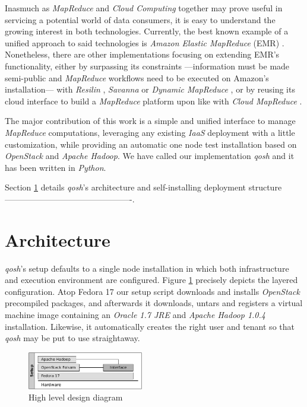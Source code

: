 \documentclass{sig-alternate}
\begin{document}
Inasmuch as \emph{MapReduce} and \emph{Cloud Computing} together may prove useful in servicing a potential world of data consumers, it is easy to understand the growing interest in both technologies. Currently, the best known example of a unified approach to said technologies is \emph{Amazon Elastic MapReduce} (EMR) \cite{emr:2013:online}. Nonetheless, there are other implementations focusing on extending EMR's functionality, either by surpassing its constraints ---information must be made semi-public and \emph{MapReduce} workflows need to be executed on Amazon's installation--- with \emph{Resilin} \cite{resilin}, \emph{Savanna} \cite{savanna:2013:online} or \emph{Dynamic MapReduce} \cite{dynamicmapreduce}, or by reusing its cloud interface to build a \emph{MapReduce} platform upon like with \emph{Cloud MapReduce} \cite{cloudmapreduce}.

The major contribution of this work is a simple and unified interface to manage \emph{MapReduce} computations, leveraging any existing \emph{IaaS} deployment with a little customization, while providing an automatic one node test installation based on \emph{OpenStack} and \emph{Apache Hadoop}. We have called our implementation \emph{qosh} and it has been written in \emph{Python}.

Section \ref{sec:arch} details \emph{qosh}'s architecture and self-installing deployment structure ----------------------------------------------.



\section{Architecture}\label{sec:arch}
\noindent \emph{qosh}'s setup defaults to a single node installation in which both infrastructure and execution environment are configured. Figure \ref{fig:arch1} precisely depicts the layered configuration. Atop Fedora 17 our setup script downloads and installs \emph{OpenStack} precompiled packages, and afterwards it downloads, untars and registers a virtual machine image containing an \emph{Oracle 1.7 JRE} and \emph{Apache Hadoop 1.0.4} installation. Likewise, it automatically creates the right user and tenant so that \emph{qosh} may be put to use straightaway.

\begin{figure}[tbp]
\centering
\includegraphics[width=0.45\textwidth]{img/002}
\caption{High level design diagram}
\label{fig:arch1}
\end{figure}
\end{document}
